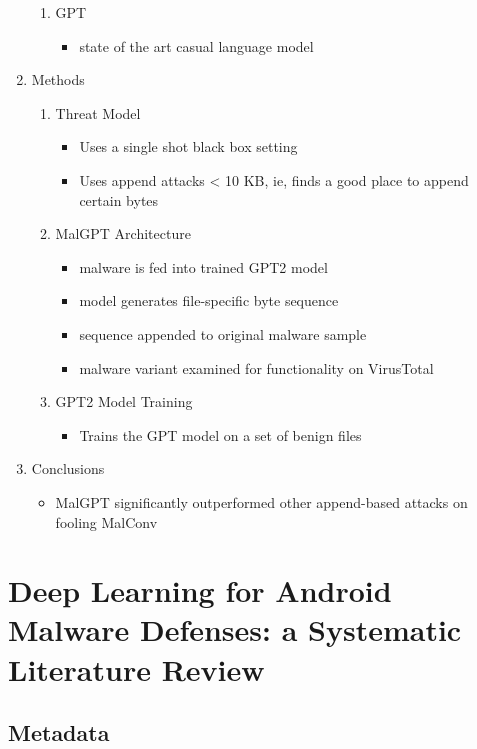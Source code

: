 \documentclass{article}
\begin{document}
\begin{enumerate}
\begin{enumerate}
		\item GPT
		\begin{itemize}
			\item state of the art casual language model
		\end{itemize}
	\end{enumerate}
	\item Methods
	\begin{enumerate}
		\item Threat Model
		\begin{itemize}
			\item Uses a single shot black box setting
			\item Uses append attacks < 10 KB, ie, finds a good place to append certain bytes
		\end{itemize}
		\item MalGPT Architecture
		\begin{itemize}
			\item malware is fed into trained GPT2 model
			\item model generates file-specific byte sequence
			\item sequence appended to original malware sample
			\item malware variant examined for functionality on VirusTotal
		\end{itemize}
		\item GPT2 Model Training
		\begin{itemize}
			\item Trains the GPT model on a set of benign files
		\end{itemize}
	\end{enumerate}
	\item Conclusions
	\begin{itemize}
		\item MalGPT significantly outperformed other append-based attacks on fooling MalConv
	\end{itemize}
\end{enumerate}

\pagebreak


\section*{Deep Learning for Android Malware Defenses: a Systematic Literature Review}

\subsection*{Metadata}
\end{document}
